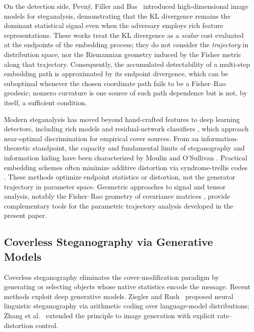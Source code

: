 \documentclass[a4paper,fleqn]{cas-dc}
\begin{document}
On the detection side, Pevn\'{y}, Filler and Bas~\cite{pevny2010using}
introduced high-dimensional image models for steganalysis, demonstrating
that the KL divergence remains the dominant statistical signal even when
the adversary employs rich feature representations.
These works treat the KL divergence as a \emph{scalar} cost evaluated at
the endpoints of the embedding process; they do not consider the
\emph{trajectory} in distribution space, nor the Riemannian geometry
induced by the Fisher metric along that trajectory.
Consequently, the accumulated detectability of a multi-step embedding
path is approximated by its endpoint divergence, which can be suboptimal whenever the chosen coordinate path fails to be a
Fisher--Rao geodesic; nonzero curvature is one source of such path dependence
but is not, by itself, a sufficient condition.

Modern steganalysis has moved beyond hand-crafted features to deep
learning detectors, including rich models \cite{fridrich2012rich} and
residual-network classifiers \cite{boroumand2019deep}, which approach
near-optimal discrimination for empirical cover sources.  From an
information-theoretic standpoint, the capacity and fundamental limits of
steganography and information hiding have been characterized by Moulin and
O'Sullivan \cite{moulin2003information}.  Practical embedding schemes often
minimize additive distortion via syndrome-trellis codes
\cite{filler2011minimizing}.  These methods optimize endpoint statistics or
distortion, not the generator trajectory in parameter space.  Geometric
approaches to signal and tensor analysis, notably the Fisher--Rao geometry
of covariance matrices \cite{pennec2006riemannian}, provide complementary
tools for the parametric trajectory analysis developed in the present paper.

\subsection{Coverless Steganography via Generative Models}

Coverless steganography eliminates the cover-modification paradigm by
generating or selecting objects whose native statistics encode the
message.
Recent methods exploit deep generative models.
Ziegler and Rush~\cite{ziegler2019neural} proposed neural linguistic
steganography via arithmetic coding over language-model distributions;
Zhang et al.~\cite{zhang2021generative} extended the principle to image
generation with explicit rate--distortion control.
\end{document}
